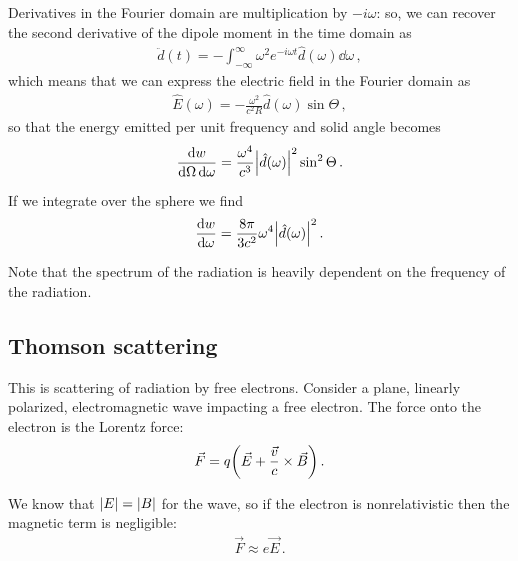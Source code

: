 \documentclass[main.tex]{subfiles}
\begin{document}
Derivatives in the Fourier domain are multiplication by \(-i \omega \): so, we can recover the second derivative of the dipole moment in the time domain as 
%
\begin{align}
\ddot{d} (t) = - \int_{- \infty }^{\infty } \omega^2 e^{-i \omega t} \hat{d}(\omega ) \dd{\omega }
\,,
\end{align}
%
which means that we can express the electric field in the Fourier domain as 
%
\begin{align}
\hat{E} ( \omega ) = - \frac{\omega^2}{c^2 R} \hat{d}(\omega ) \sin \Theta 
\,,
\end{align}
%
so that the energy emitted per unit frequency and solid angle becomes 
%
\begin{align}
\frac{ \dd{w}}{ \dd{\Omega } \dd{\omega }}  = \frac{\omega^{4}}{c^3} \abs{\hat{d}(\omega  )}^2 \sin^2 \Theta 
\,.
\end{align}

If we integrate over the sphere we find 
%
\begin{align} \label{eq:spectral-distribution-dipole}
\dv{w}{\omega } = \frac{8 \pi }{3 c^2} \omega^{4} \abs{\hat{d}(\omega )}^2
\,.
\end{align}

Note that the spectrum of the radiation is heavily dependent on the frequency of the radiation. 

\subsection{Thomson scattering}

This is scattering of radiation by free electrons. 
Consider a plane, linearly polarized, electromagnetic wave impacting a free electron. The force onto the electron is the Lorentz force: 
%
\begin{align}
\vec{F} = q \qty(\vec{E} + \frac{\vec{v}}{c} \times \vec{B})
\,.
\end{align}

We know that \(\abs{E} = \abs{B}\) for the wave, so if the electron is nonrelativistic then the magnetic term is negligible: 
%
\begin{align}
\vec{F} \approx e \vec{E}
\,.
\end{align}
\end{document}
